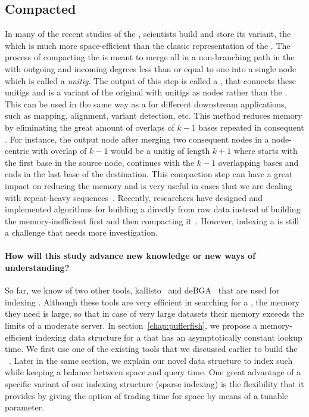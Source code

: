 \subsection{Compacted \dbg}
\label{subsubsec:cdbg}
In many of the recent studies of the \dbg, scientists build
and store its variant, the \ccdbg which is much more space-efficient
than the classic representation of the \dbg.
The process of compacting the \dbg is meant to merge all \kmers in a non-branching path
in the \dbg with outgoing and incoming degrees less than or
equal to one into a single node which is called a \emph{unitig}.
The output of this step is called a \compdbg,
that connects these unitigs and is a variant of the original \dbg
with unitigs as nodes rather than the \kmers.
This can be used in the same way as a \dbg for different downstream applications,
such as mapping, alignment, variant detection, etc.
This method reduces memory by eliminating the great amount of overlaps of $k-1$ bases
repeated in consequent \kmers.
For instance, the output node after merging two consequent nodes in a node-centric \dbg
with overlap of $k-1$ would be a unitig of length $k+1$ where starts with the first base in the source node,
continues with the $k-1$ overlapping bases and ends in
the last base of the destination.
This compaction step can have a great impact on reducing the memory
and is very useful in cases that we are dealing with repeat-heavy sequences~\cite{liu2016debga}.
Recently, researchers have designed and implemented algorithms for building
a \ccdbg directly from raw data instead of building the memory-inefficient \dbg first
and then compacting it~\cite{minkin2016twopaco,chikhi2016compacting}.
However, indexing a \ccdbg is still a challenge that needs more investigation.

\paragraph*{How will this study advance new knowledge or new ways of understanding?}
So far, we know of two other tools, kallisto~\cite{Bray2016Kallisto}
and deBGA~\cite{liu2016debga} that are used for indexing \ccdbgs.
Although these tools are very efficient in searching for a \kmer, the memory they need is large,
so that in case of very large datasets their memory exceeds the limits of a moderate server.
In section~\ref{chap:pufferfish}, we propose a memory-efficient indexing data structure
for a \ccdbg that has an asymptotically constant \kmer lookup time.
We first use one of the existing tools that we discussed earlier to build the \ccdbg~\cite{minkin2016twopaco}.
Later in the same section, we explain our novel data structure to index such \ccdbgs
while keeping a balance between space and query time.
One great advantage of a specific variant of our indexing structure (sparse indexing)
is the flexibility that it provides by giving the option of trading time for space
by means of a tunable parameter.

